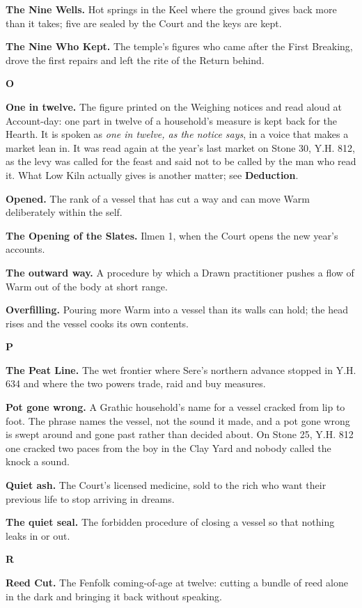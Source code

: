 \documentclass{design/chronicle}
\begin{document}
\textbf{The Nine Wells.} Hot springs in the Keel where the ground gives back more than it takes; five are sealed by the Court and the keys are kept.

\textbf{The Nine Who Kept.} The temple’s figures who came after the First Breaking, drove the first repairs and left the rite of the Return behind.

\textbf{O}

\textbf{One in twelve.} The figure printed on the Weighing notices and read aloud at Account-day: one part in twelve of a household’s measure is kept back for the Hearth. It is spoken as \emph{one in twelve, as the notice says}, in a voice that makes a market lean in. It was read again at the year’s last market on Stone 30, Y.H. 812, as the levy was called for the feast and said not to be called by the man who read it. What Low Kiln actually gives is another matter; see \textbf{Deduction}.

\textbf{Opened.} The rank of a vessel that has cut a way and can move Warm deliberately within the self.

\textbf{The Opening of the Slates.} Ilmen 1, when the Court opens the new year’s accounts.

\textbf{The outward way.} A procedure by which a Drawn practitioner pushes a flow of Warm out of the body at short range.

\textbf{Overfilling.} Pouring more Warm into a vessel than its walls can hold; the head rises and the vessel cooks its own contents.

\textbf{P}

\textbf{The Peat Line.} The wet frontier where Sere’s northern advance stopped in Y.H. 634 and where the two powers trade, raid and buy measures.

\textbf{Pot gone wrong.} A Grathic household’s name for a vessel cracked from lip to foot. The phrase names the vessel, not the sound it made, and a pot gone wrong is swept around and gone past rather than decided about. On Stone 25, Y.H. 812 one cracked two paces from the boy in the Clay Yard and nobody called the knock a sound.

\textbf{Quiet ash.} The Court’s licensed medicine, sold to the rich who want their previous life to stop arriving in dreams.

\textbf{The quiet seal.} The forbidden procedure of closing a vessel so that nothing leaks in or out.

\textbf{R}

\textbf{Reed Cut.} The Fenfolk coming-of-age at twelve: cutting a bundle of reed alone in the dark and bringing it back without speaking.
\end{document}

